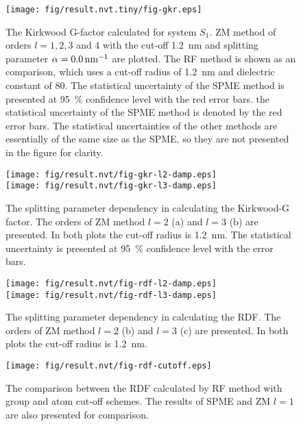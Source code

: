 \documentclass[aip,jcp,a4paper,reprint,unsortedaddress,onecolumn,fleqn]{revtex4}
\begin{document}
\begin{figure}[tbp]
\centering
\texttt{[image: fig/result.nvt.tiny/fig-gkr.eps]}
\caption{
  The Kirkwood G-factor calculated for system $S_{1}$.
  ZM method of orders $l=1,2,3$ and 4 with the cut-off 1.2~nm and
splitting parameter $\protect\alpha =0.0\,\text{nm}^{-1}$ are plotted. The
RF method is shown as an comparison, which uses a cut-off radius of 1.2~nm
and dielectric constant of 80. The statistical uncertainty of the SPME
method is presented at 95~\% confidence level with the red error bars. the
statistical uncertainty of the SPME method is denoted by the red error bars.
The statistical uncertainties of the other methods are essentially of the
same size as the SPME, so they are not presented in the figure for clarity.
}
\label{fig:gkr-conv-alpha}
\end{figure}

\begin{figure}[tbp]
\centering
\texttt{[image: fig/result.nvt/fig-gkr-l2-damp.eps]}\\
\texttt{[image: fig/result.nvt/fig-gkr-l3-damp.eps]}
\caption{  The 
  splitting parameter dependency in calculating the Kirkwood-G factor.
  The orders of ZM method $l=2$ (a)  and $l=3$ (b) are presented.
  In both plots the cut-off radius is 1.2~nm. The
  statistical uncertainty is presented at 95~\% confidence level with the
  error bars. }
\label{fig:gkr-conv-alpha}
\end{figure}


\begin{figure}[tbp]
\centering
\texttt{[image: fig/result.nvt/fig-rdf-l2-damp.eps]}\\
\texttt{[image: fig/result.nvt/fig-rdf-l3-damp.eps]}
\caption{  The 
  splitting parameter dependency in calculating the RDF.
  The orders of ZM method  $l=2$ (b)  and $l=3$ (c) are presented.
  In both plots the cut-off radius is 1.2~nm. }
\label{fig:gkr-conv-alpha}
\end{figure}


\begin{figure}[tbp]
\centering
\texttt{[image: fig/result.nvt/fig-rdf-cutoff.eps]}\\
\caption{  The comparison between the RDF calculated by RF method with group and atom cut-off schemes.
The results of SPME and ZM $l=1$ are also presented for comparison.}
\label{fig:gkr-conv-alpha}
\end{figure}


\newpage 

{}

\end{document}
